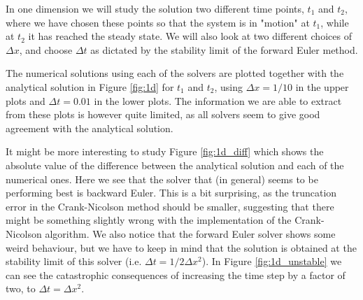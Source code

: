 \documentclass[12pt, a4paper]{article}
\begin{document}
In one dimension we will study the solution two different time points, $t_1$ and $t_2$, where we 
have chosen these points so that the system is in "motion" at $t_1$, while at $t_2$ it has reached 
the steady state. We will also look at two different choices of $\Delta x$, and choose $\Delta t$ as 
dictated by the stability limit of the forward Euler method. 

The numerical solutions using each of the solvers are plotted together with the analytical solution 
in Figure \ref{fig:1d} for $t_1$ and $t_2$, using $\Delta x = 1/10$ in the upper plots and 
$\Delta t = 0.01$ in the lower plots. The 
information we are able to extract from these plots is however quite limited, as all solvers seem to 
give good agreement with the analytical solution. 

It might be more interesting to study Figure 
\ref{fig:1d_diff} which shows the absolute value of the difference between the analytical solution and 
each of the numerical ones. Here we see that the solver that (in general) seems to be performing best is 
backward Euler. This is a bit surprising, as the truncation error in the Crank-Nicolson method should be
smaller, suggesting that there might be something slightly wrong with the implementation of the 
Crank-Nicolson algorithm. We also notice that the forward Euler solver shows some weird behaviour, but 
we have to keep in mind that the solution is obtained at the stability limit of this solver 
(i.e. $\Delta t = 1/2 \Delta x^2$). In Figure \ref{fig:1d_unstable} we can see the catastrophic 
consequences of increasing the time step by a factor of two, to $\Delta t = \Delta x^2$.        
\end{document}
